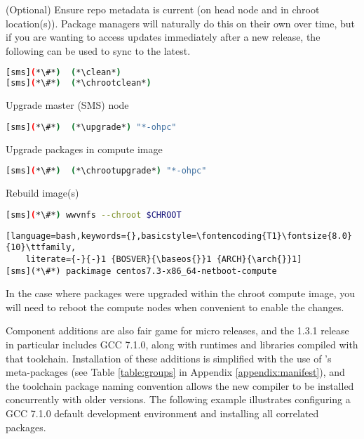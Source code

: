 \begin{enumerate*}
\item (Optional) Ensure repo metadata is current (on head node and in chroot
  location(s)). Package managers will naturally do this on their own over time,
  but if you are wanting to access updates immediately after a new release,
  the following can be used to sync to the latest.

\begin{lstlisting}[language=bash,keywords={}]
[sms](*\#*)  (*\clean*)
[sms](*\#*)  (*\chrootclean*)
\end{lstlisting}

\item Upgrade master (SMS) node

\begin{lstlisting}[language=bash,keywords={}]
[sms](*\#*)  (*\upgrade*) "*-ohpc"
\end{lstlisting}
  
\item Upgrade packages in compute image

\begin{lstlisting}[language=bash,keywords={}]
[sms](*\#*)  (*\chrootupgrade*) "*-ohpc"
\end{lstlisting}
  
\item Rebuild image(s)

\begin{lstlisting}[language=bash,keywords={}]
[sms](*\#*) wwvnfs --chroot $CHROOT
\end{lstlisting}
\fi

\begin{lstlisting}[language=bash,keywords={},basicstyle=\fontencoding{T1}\fontsize{8.0}{10}\ttfamily,
    literate={-}{-}1 {BOSVER}{\baseos{}}1 {ARCH}{\arch{}}1]
[sms](*\#*) packimage centos7.3-x86_64-netboot-compute
\end{lstlisting}
\fi

\end{enumerate*}

\noindent In the case where packages were upgraded within the chroot compute image,
you will need to reboot the compute nodes when convenient to enable the
changes.

Component additions are also fair game for \OHPC{} micro releases, and the 1.3.1
release in particular includes GCC 7.1.0, along with runtimes and libraries
compiled with that toolchain. Installation of these additions is simplified
with the use of \OHPC{}'s meta-packages (see Table \ref{table:groups} in Appendix 
\ref{appendix:manifest}), and the toolchain package naming 
convention allows the new compiler to be installed concurrently with older 
versions. The following example illustrates configuring a GCC 7.1.0 default
development environment and installing all correlated packages.

